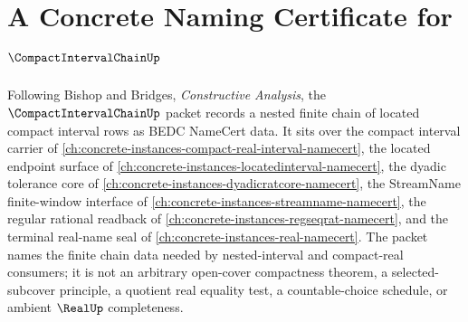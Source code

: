 \chapter{A Concrete Naming Certificate for $\CompactIntervalChainUp$}
\label{ch:concrete-instances-compact-interval-chain-namecert}

Following Bishop and Bridges, \emph{Constructive Analysis}, the $\CompactIntervalChainUp$ packet records a nested finite chain of located compact interval rows as BEDC NameCert data. It sits over the compact interval carrier of \autoref{ch:concrete-instances-compact-real-interval-namecert}, the located endpoint surface of \autoref{ch:concrete-instances-locatedinterval-namecert}, the dyadic tolerance core of \autoref{ch:concrete-instances-dyadicratcore-namecert}, the StreamName finite-window interface of \autoref{ch:concrete-instances-streamname-namecert}, the regular rational readback of \autoref{ch:concrete-instances-regseqrat-namecert}, and the terminal real-name seal of \autoref{ch:concrete-instances-real-namecert}. The packet names the finite chain data needed by nested-interval and compact-real consumers; it is not an arbitrary open-cover compactness theorem, a selected-subcover principle, a quotient real equality test, a countable-choice schedule, or ambient $\RealUp$ completeness.

